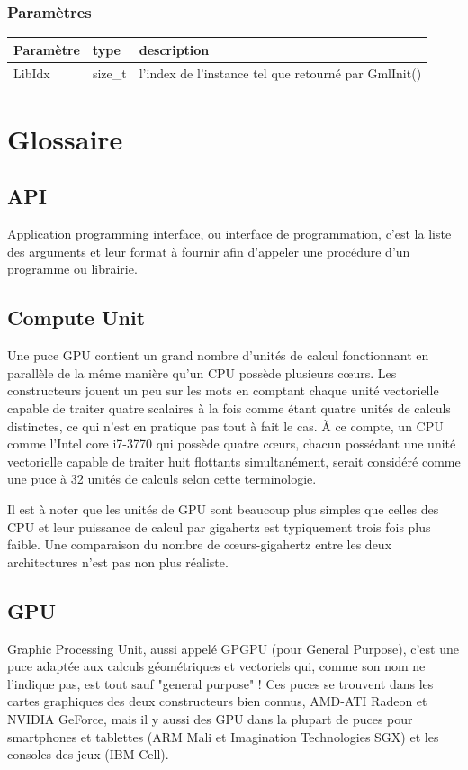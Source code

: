 \documentclass[a4paper,12pt]{article}
\begin{document}
\subsubsection*{Paramètres}

\begin{tabular}{|m{2cm}|m{1.5cm}|m{10.5cm}|}
\hline
Paramètre  & type    & description \\
\hline
LibIdx     & size\_t & l'index de l'instance tel que retourné par GmlInit() \\
\hline
\end{tabular}


%
%


\section{Glossaire}

\subsection{API}
Application programming interface, ou interface de programmation, c'est la liste des arguments et leur format à fournir afin d'appeler une procédure d'un programme ou librairie.

\subsection{Compute Unit}
Une puce GPU contient un grand nombre d'unités de calcul fonctionnant en parallèle de la même manière qu'un CPU possède plusieurs c\oe urs. Les constructeurs jouent un peu sur les mots en comptant chaque unité vectorielle capable de traiter quatre scalaires à la fois comme étant quatre unités de calculs distinctes, ce qui n'est en pratique pas tout à fait le cas. À ce compte, un CPU comme l'Intel core i7-3770 qui possède quatre c\oe urs, chacun possédant une unité vectorielle capable de traiter huit flottants simultanément, serait considéré comme une puce à 32 unités de calculs selon cette terminologie.

Il est à noter que les unités de GPU sont beaucoup plus simples que celles des CPU et leur puissance de calcul par gigahertz est typiquement trois fois plus faible. Une comparaison du nombre de c\oe urs-gigahertz entre les deux architectures n'est pas non plus réaliste.

\subsection{GPU}
Graphic Processing Unit, aussi appelé GPGPU (pour General Purpose), c'est une puce adaptée aux calculs géométriques et vectoriels qui, comme son nom ne l'indique pas, est tout sauf "general purpose" !
Ces puces se trouvent dans les cartes graphiques des deux constructeurs bien connus, AMD-ATI Radeon et NVIDIA GeForce, mais il y aussi des GPU dans la plupart de puces pour smartphones et tablettes (ARM Mali et Imagination Technologies SGX) et les consoles des jeux (IBM Cell).
\end{document}
